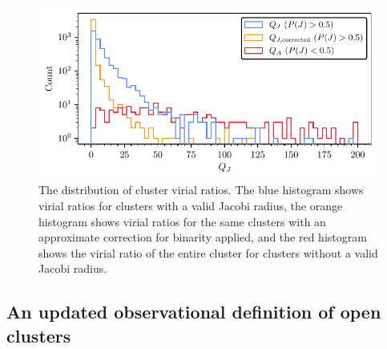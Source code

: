 \begin{figure}[t]
    \centering
    \includegraphics[width=\textwidth]{fig/c4/results_q_distribution.pdf}
    \caption[The distribution of cluster virial ratios]{The distribution of cluster virial ratios. The blue histogram shows virial ratios for clusters with a valid Jacobi radius, the orange histogram shows virial ratios for the same clusters with an approximate correction for binarity applied, and the red histogram shows the virial ratio of the entire cluster for clusters without a valid Jacobi radius.}
    \label{fig:dynamics:results:virial_ratio_distribution}
\end{figure}


\subsection{An updated observational definition of open clusters}
\label{sec:dynamics:results:definition}

